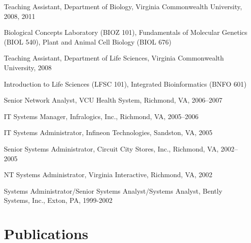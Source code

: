 \begin{packed_item}
	\item{Teaching Assistant, Department of Biology, Virginia Commonwealth University, 2008, 2011}
	
	\begin{packed_item}
	\item{Biological Concepts Laboratory (BIOZ 101), 
	Fundamentals of Molecular Genetics (BIOL 540), 
	Plant and Animal Cell Biology (BIOL 676) }
	\end{packed_item}
	
	\item{Teaching Assistant, Department of Life Sciences, Virginia Commonwealth University, 2008}
	
	\begin{packed_item}
	\item{Introduction to Life Sciences (LFSC 101), Integrated Bioinformatics (BNFO 601)}
	\end{packed_item}
	
	\item{Senior Network Analyst, VCU Health System, Richmond, VA, 
	2006--2007}
	\item{IT Systems Manager, Infralogics, Inc., Richmond, VA, 2005--2006}
	\item{IT Systems Administrator, Infineon Technologies, Sandston, VA, 2005}
	\item{Senior Systems Administrator, Circuit City Stores, Inc., Richmond, VA, 2002--2005}
	\item{NT Systems Administrator, Virginia Interactive, Richmond, VA, 2002}
	\item{Systems Administrator/Senior Systems Analyst/Systems Analyst, Bently Systems, 
	Inc., Exton, PA, 1999-2002}
\end{packed_item}

\section{Publications}

